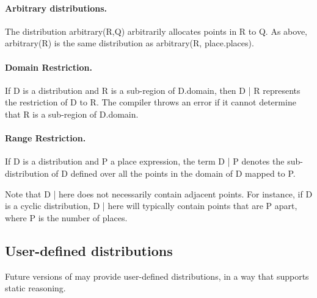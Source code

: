 \paragraph{Arbitrary distributions.} 
The distribution {\cf arbitrary(R,Q)} arbitrarily allocates points in {\cf
R} to {\cf Q}. As above, {\cf arbitrary(R)} is the same distribution as
{\cf arbitrary(R, place.places)}.


\paragraph{Domain Restriction.} 

If {\cf D} is a distribution and {\cf R} is a sub-region of {\cf
D.domain}, then {\cf D | R} represents the restriction of {\cf D} to
{\cf R}.  The compiler throws an error if it cannot determine that
{\cf R} is a sub-region of {\cf D.domain}.

\paragraph{Range Restriction.}

If {\cf D} is a distribution and {\cf P} a place expression, the term
{\cf D | P} denotes the sub-distribution of {\cf D} defined over all the
points in the domain of {\cf D} mapped to {\cf P}.

Note that {\cf D | here} does not necessarily contain adjacent
points. For instance, if {\cf D} is a cyclic distribution, {\cf D |
here} will typically contain points that are {\cf P} apart, where {\cf
P} is the number of places.

\subsection{User-defined distributions}

Future versions of \Xten{} may provide user-defined distributions, in
a way that supports static reasoning.


